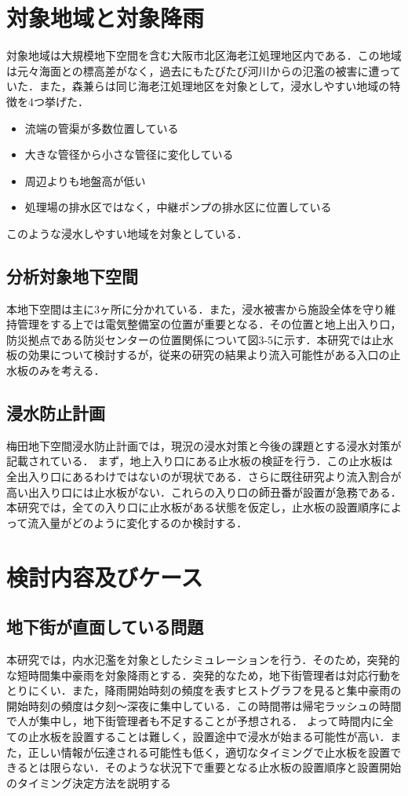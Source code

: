 \documentclass[a4j]{jarticle}
\begin{document}
\section{対象地域と対象降雨}
対象地域は大規模地下空間を含む大阪市北区海老江処理地区内である．この地域は元々海面との標高差がなく，過去にもたびたび河川からの氾濫の被害に遭っていた．また，森兼らは同じ海老江処理地区を対象として，浸水しやすい地域の特徴を4つ挙げた．
\begin{itemize}
\item 流端の管渠が多数位置している
\item 大きな管径から小さな管径に変化している
\item 周辺よりも地盤高が低い
\item 処理場の排水区ではなく，中継ポンプの排水区に位置している
\end{itemize}
このような浸水しやすい地域を対象としている．
\subsection{分析対象地下空間}
本地下空間は主に3ヶ所に分かれている．また，浸水被害から施設全体を守り維持管理をする上では電気整備室の位置が重要となる．その位置と地上出入り口，防災拠点である防災センターの位置関係について図3-5に示す．本研究では止水板の効果について検討するが，従来の研究の結果より流入可能性がある入口の止水板のみを考える．
\subsection{浸水防止計画}
梅田地下空間浸水防止計画では，現況の浸水対策と今後の課題とする浸水対策が記載されている．
まず，地上入り口にある止水板の検証を行う．この止水板は全出入り口にあるわけではないのが現状である．さらに既往研究より流入割合が高い出入り口には止水板がない．これらの入り口の師丑番が設置が急務である．本研究では，全ての入り口に止水板がある状態を仮定し，止水板の設置順序によって流入量がどのように変化するのか検討する．
\section{検討内容及びケース}
\subsection{地下街が直面している問題}
本研究では，内水氾濫を対象としたシミュレーションを行う．そのため，突発的な短時間集中豪雨を対象降雨とする．突発的なため，地下街管理者は対応行動をとりにくい．また，降雨開始時刻の頻度を表すヒストグラフを見ると集中豪雨の開始時刻の頻度は夕刻～深夜に集中している．この時間帯は帰宅ラッシュの時間で人が集中し，地下街管理者も不足することが予想される．
よって時間内に全ての止水板を設置することは難しく，設置途中で浸水が始まる可能性が高い．また，正しい情報が伝達される可能性も低く，適切なタイミングで止水板を設置できるとは限らない．そのような状況下で重要となる止水板の設置順序と設置開始のタイミング決定方法を説明する
\end{document}
